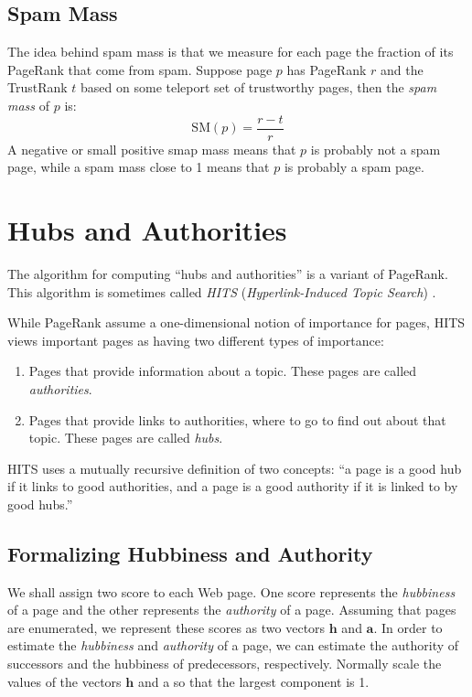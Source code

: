 \subsection{Spam Mass}\label{subsec:spam-mass}

The idea behind spam mass is that we measure for each page the fraction of its PageRank that come from spam. Suppose page $p$ has PageRank $r$ and the TrustRank $t$ based on some teleport set of trustworthy pages, then the \textit{spam mass} of $p$ is:
\begin{equation*}
    \text{SM} (p) = \frac{r - t}{r}
\end{equation*}
A negative or small positive smap mass means that $p$ is probably not a spam page, while a spam mass close to 1 means that $p$ is probably a spam page.

\section{Hubs and Authorities}\label{sec:hubs-and-authorities}

The algorithm for computing ``hubs and authorities'' is a variant of PageRank. This algorithm is sometimes called \textit{HITS} (\textit{Hyperlink-Induced Topic Search}) . 

While PageRank assume a one-dimensional notion of importance for pages, HITS views important pages as having two different types of importance:

\begin{enumerate}
    \item Pages that provide information about a topic. These pages are called \textit{authorities}.
    \item Pages that provide links to authorities, where to go to find out about that topic. These pages are called \textit{hubs}.
\end{enumerate}

\noindent HITS uses a mutually recursive definition of two concepts: ``a page is a good hub if it links to good authorities, and a page is a good authority if it is linked to by good hubs.''

\subsection{Formalizing Hubbiness and Authority}\label{subsec:formalizing-hubbiness-and-authority}

We shall assign two score to each Web page. One score represents the \textit{hubbiness} of a page and the other represents the \textit{authority} of a page. Assuming that pages are enumerated, we represent these scores as two vectors $\mathbf{h}$ and $\mathbf{a}$. In order to estimate the \textit{hubbiness} and \textit{authority} of a page, we can estimate the authority of successors and the hubbiness of predecessors, respectively. Normally scale the values of the vectors $\mathbf{h}$ and a so that the largest component is 1. 


